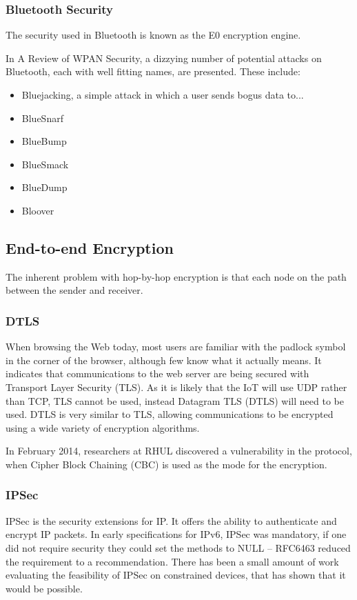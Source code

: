 \documentclass[10pt,journal,compsoc]{IEEEtran}
\begin{document}
\subsubsection{Bluetooth Security}
The security used in Bluetooth is known as the E0 encryption engine. 

In A Review of WPAN Security\cite{Kennedy2008}, a dizzying number of potential
attacks on Bluetooth, each with well fitting names, are presented. These include: 
\begin{itemize}
\item Bluejacking, a simple attack in which a user sends bogus data to...
\item BlueSnarf
\item BlueBump
\item BlueSmack
\item BlueDump
\item Bloover
\end{itemize}


\subsection{End-to-end Encryption}
The inherent problem with hop-by-hop encryption is that each node on the path
between the sender and receiver.   

\subsubsection{DTLS}
When browsing the Web today, most users are familiar with the padlock symbol in
the corner of the browser, although few know what it actually means. It
indicates that communications to the web server are being secured with
Transport Layer Security (TLS). As it is likely that the IoT will use UDP
rather than TCP, TLS cannot be used, instead Datagram TLS (DTLS) will need to
be used. DTLS is very similar to TLS, allowing communications to be encrypted
using a wide variety of encryption algorithms.  

In February 2014, researchers at RHUL discovered a vulnerability in the
protocol, when Cipher Block Chaining (CBC) is used as the mode for the
encryption. 


\subsubsection{IPSec}
IPSec is the security extensions for IP. It offers the ability to authenticate
and encrypt IP packets. In early specifications for IPv6, IPSec was mandatory,
if one did not require security they could set the methods to NULL -- RFC6463
reduced the requirement to a recommendation. There has been a small amount
of work evaluating the feasibility of IPSec on constrained devices, that
has shown that it would be possible. 
\end{document}
